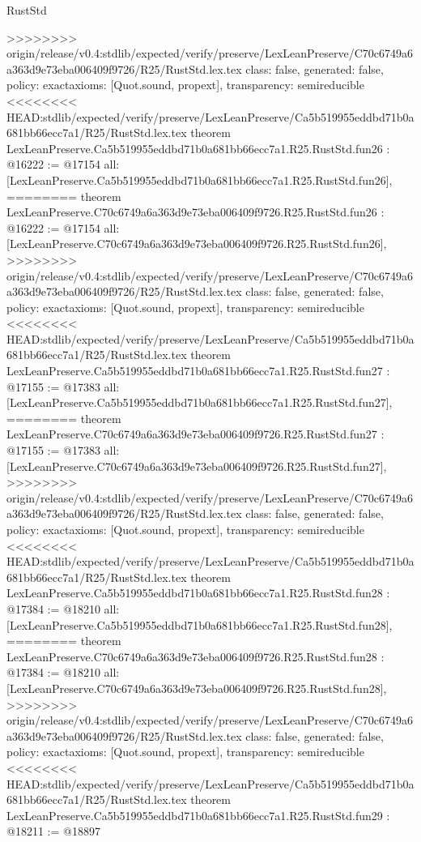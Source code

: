 \begin{lexlean}{RustStd}
\begin{coremodule}
{\begin{coremodule}
{{{{{{{{{{{{{{{{{{{{{{{{{{{{{>>>>>>>> origin/release/v0.4:stdlib/expected/verify/preserve/LexLeanPreserve/C70c6749a6a363d9e73eba006409f9726/R25/RustStd.lex.tex
  class: false,
  generated: false,
  policy: exact{axioms: [Quot.sound, propext]},
  transparency: semireducible
}
<<<<<<<< HEAD:stdlib/expected/verify/preserve/LexLeanPreserve/Ca5b519955eddbd71b0a681bb66ecc7a1/R25/RustStd.lex.tex
theorem LexLeanPreserve.Ca5b519955eddbd71b0a681bb66ecc7a1.R25.RustStd.fun26 : @16222 := @17154 {
  all: [LexLeanPreserve.Ca5b519955eddbd71b0a681bb66ecc7a1.R25.RustStd.fun26],
========
theorem LexLeanPreserve.C70c6749a6a363d9e73eba006409f9726.R25.RustStd.fun26 : @16222 := @17154 {
  all: [LexLeanPreserve.C70c6749a6a363d9e73eba006409f9726.R25.RustStd.fun26],
>>>>>>>> origin/release/v0.4:stdlib/expected/verify/preserve/LexLeanPreserve/C70c6749a6a363d9e73eba006409f9726/R25/RustStd.lex.tex
  class: false,
  generated: false,
  policy: exact{axioms: [Quot.sound, propext]},
  transparency: semireducible
}
<<<<<<<< HEAD:stdlib/expected/verify/preserve/LexLeanPreserve/Ca5b519955eddbd71b0a681bb66ecc7a1/R25/RustStd.lex.tex
theorem LexLeanPreserve.Ca5b519955eddbd71b0a681bb66ecc7a1.R25.RustStd.fun27 : @17155 := @17383 {
  all: [LexLeanPreserve.Ca5b519955eddbd71b0a681bb66ecc7a1.R25.RustStd.fun27],
========
theorem LexLeanPreserve.C70c6749a6a363d9e73eba006409f9726.R25.RustStd.fun27 : @17155 := @17383 {
  all: [LexLeanPreserve.C70c6749a6a363d9e73eba006409f9726.R25.RustStd.fun27],
>>>>>>>> origin/release/v0.4:stdlib/expected/verify/preserve/LexLeanPreserve/C70c6749a6a363d9e73eba006409f9726/R25/RustStd.lex.tex
  class: false,
  generated: false,
  policy: exact{axioms: [Quot.sound, propext]},
  transparency: semireducible
}
<<<<<<<< HEAD:stdlib/expected/verify/preserve/LexLeanPreserve/Ca5b519955eddbd71b0a681bb66ecc7a1/R25/RustStd.lex.tex
theorem LexLeanPreserve.Ca5b519955eddbd71b0a681bb66ecc7a1.R25.RustStd.fun28 : @17384 := @18210 {
  all: [LexLeanPreserve.Ca5b519955eddbd71b0a681bb66ecc7a1.R25.RustStd.fun28],
========
theorem LexLeanPreserve.C70c6749a6a363d9e73eba006409f9726.R25.RustStd.fun28 : @17384 := @18210 {
  all: [LexLeanPreserve.C70c6749a6a363d9e73eba006409f9726.R25.RustStd.fun28],
>>>>>>>> origin/release/v0.4:stdlib/expected/verify/preserve/LexLeanPreserve/C70c6749a6a363d9e73eba006409f9726/R25/RustStd.lex.tex
  class: false,
  generated: false,
  policy: exact{axioms: [Quot.sound, propext]},
  transparency: semireducible
}
<<<<<<<< HEAD:stdlib/expected/verify/preserve/LexLeanPreserve/Ca5b519955eddbd71b0a681bb66ecc7a1/R25/RustStd.lex.tex
theorem LexLeanPreserve.Ca5b519955eddbd71b0a681bb66ecc7a1.R25.RustStd.fun29 : @18211 := @18897 {
}}}}}}}}}}}}}}}}}}}}}}}}}}}}}}}}
\end{coremodule}}
\end{coremodule}
\end{lexlean}

